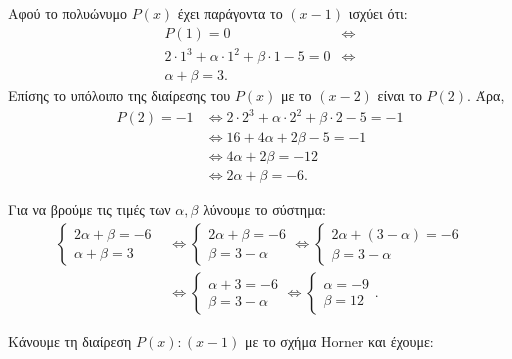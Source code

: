 \begin{alist}
\item
\begin{rlist}
\item Αφού το πολυώνυμο $P(x)$ έχει παράγοντα το $(x-1)$ ισχύει ότι:
\begin{align*}
P(1) = 0 &\Leftrightarrow \\
2 \cdot 1^3 + \alpha \cdot 1^2 + \beta \cdot 1 - 5 = 0 &\Leftrightarrow \\
\alpha + \beta = 3.
\end{align*}
Επίσης το υπόλοιπο της διαίρεσης του $P(x)$ με το $(x-2)$ είναι το $P(2)$. Άρα,
\begin{align*}
P(2) = -1 &\Leftrightarrow 2 \cdot 2^3 + \alpha \cdot 2^2 + \beta \cdot 2 - 5 = -1 \\
&\Leftrightarrow 16 + 4\alpha + 2\beta - 5 = -1 \\
&\Leftrightarrow 4\alpha + 2\beta = -12 \\
&\Leftrightarrow 2\alpha + \beta = -6.
\end{align*}
\item Για να βρούμε τις τιμές των $\alpha, \beta$ λύνουμε το σύστημα:
\begin{align*}
\begin{cases} 2\alpha + \beta = -6 \\ \alpha + \beta = 3 \end{cases} &\Leftrightarrow \begin{cases} 2\alpha + \beta = -6 \\ \beta = 3 - \alpha \end{cases} \Leftrightarrow \begin{cases} 2\alpha + (3 - \alpha) = -6 \\ \beta = 3 - \alpha \end{cases} \\
&\Leftrightarrow \begin{cases} \alpha + 3 = -6 \\ \beta = 3 - \alpha \end{cases} \Leftrightarrow \begin{cases} \alpha = -9 \\ \beta = 12 \end{cases}.
\end{align*}
\end{rlist}
\item Κάνουμε τη διαίρεση $P(x) : (x-1)$ με το σχήμα Horner και έχουμε:
\begin{center}

\end{center}
\end{alist}
